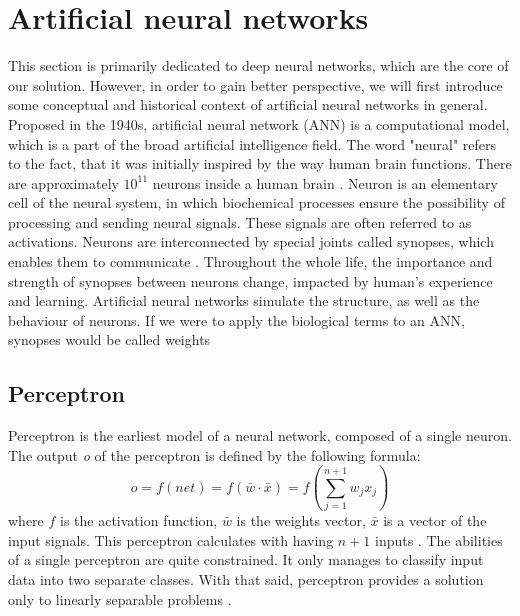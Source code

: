 \section{Artificial neural networks}
This section is primarily dedicated to deep neural networks, which are the core of our solution. However, in order to gain better perspective, we will first introduce some conceptual and historical context of artificial neural networks in general.\\
Proposed in the 1940s, artificial neural network (ANN) is a computational model, which is a part of the broad artificial intelligence field. The word "neural" refers to the fact, that it was initially inspired by the way human brain functions. There are approximately $10^{11}$ neurons inside a human brain \cite{navrat2007umela}. Neuron is an elementary cell of the neural system, in which biochemical processes ensure the possibility of processing and sending neural signals. These signals are often referred to as activations. Neurons are interconnected by special joints called synopses, which enables them to communicate \cite{navrat2007umela}. Throughout the whole life, the importance and strength of synopses between neurons change, impacted by human's experience and learning. Artificial neural networks simulate the structure, as well as the behaviour of neurons. If we were to apply the biological terms to an ANN, synopses would be called weights
\subsection*{Perceptron} 
Perceptron is the earliest model of a neural network, composed of a single neuron. The output \textit{o} of the perceptron is defined by the following formula:
\begin{equation}
    o = f(net) = f(\bar w \cdot \bar x) = f (\sum_{j=1}^{n+1} w_jx_j)
\end{equation}
where $f$ is the activation function, $\bar w$ is the weights vector, $\bar x$ is a vector of the input signals. This perceptron calculates with having $n+1$ inputs \cite{navrat2007umela}. The abilities of a single perceptron are quite constrained. It only manages to classify input data into two separate classes. With that said, perceptron provides a solution only to linearly separable problems \cite{navrat2007umela}.
